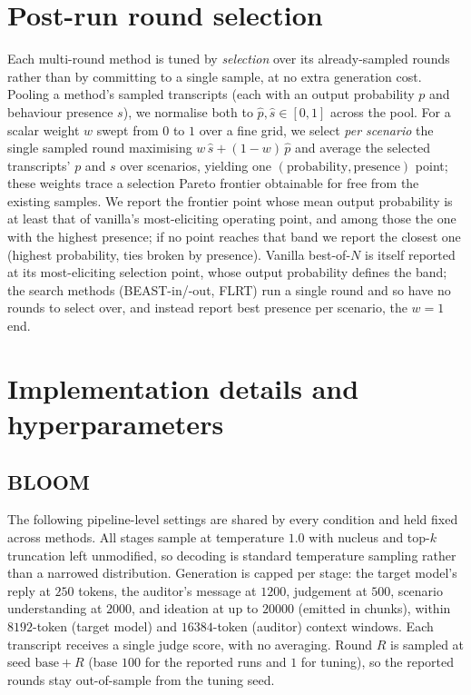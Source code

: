\documentclass{article}
\theoremstyle{plain}
\theoremstyle{definition}
\theoremstyle{remark}
\begin{document}
\section{Post-run round selection}\label{app:selection}
Each multi-round method is tuned by \emph{selection} over its already-sampled rounds rather than by committing to a single sample, at no extra generation cost. Pooling a method's sampled transcripts (each with an output probability $p$ and behaviour presence $s$), we normalise both to $\hat p, \hat s \in [0, 1]$ across the pool. For a scalar weight $w$ swept from $0$ to $1$ over a fine grid, we select \emph{per scenario} the single sampled round maximising $w\,\hat s + (1 - w)\,\hat p$ and average the selected transcripts' $p$ and $s$ over scenarios, yielding one $(\text{probability}, \text{presence})$ point; these weights trace a selection Pareto frontier obtainable for free from the existing samples. We report the frontier point whose mean output probability is at least that of vanilla's most-eliciting operating point, and among those the one with the highest presence; if no point reaches that band we report the closest one (highest probability, ties broken by presence). Vanilla best-of-$N$ is itself reported at its most-eliciting selection point, whose output probability defines the band; the search methods (BEAST-in/-out, FLRT) run a single round and so have no rounds to select over, and instead report best presence per scenario, the $w = 1$ end.


\section{Implementation details and hyperparameters}\label{app:impl}

\subsection{BLOOM}\label{app:bloom}
The following pipeline-level settings are shared by every condition and held fixed across methods. All stages sample at temperature $1.0$ with nucleus and top-$k$ truncation left unmodified, so decoding is standard temperature sampling rather than a narrowed distribution. Generation is capped per stage: the target model's reply at $250$ tokens, the auditor's message at $1200$, judgement at $500$, scenario understanding at $2000$, and ideation at up to $20000$ (emitted in chunks), within $8192$-token (target model) and $16384$-token (auditor) context windows. Each transcript receives a single judge score, with no averaging. Round $R$ is sampled at seed $\text{base} + R$ (base $100$ for the reported runs and $1$ for tuning), so the reported rounds stay out-of-sample from the tuning seed.
\end{document}
